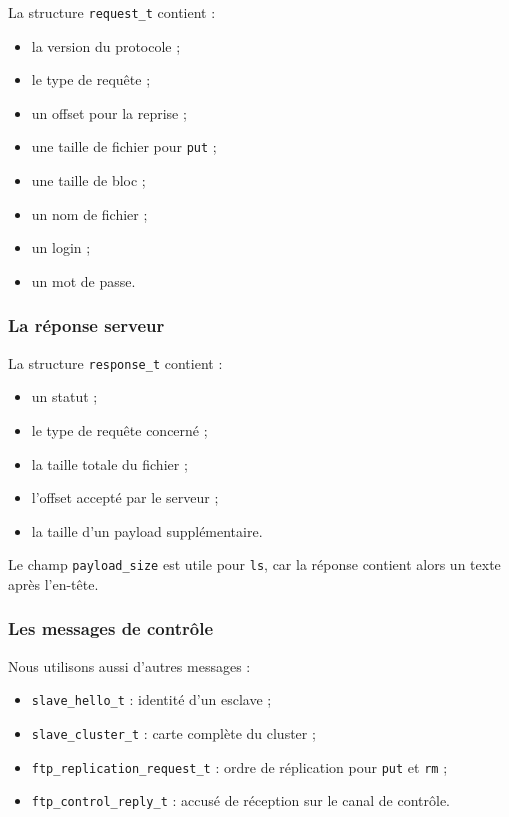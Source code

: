\documentclass[a4paper,11pt]{article}
\begin{document}
La structure \texttt{request\_t} contient :

\begin{itemize}[leftmargin=*]
    \item la version du protocole ;
    \item le type de requête ;
    \item un offset pour la reprise ;
    \item une taille de fichier pour \texttt{put} ;
    \item une taille de bloc ;
    \item un nom de fichier ;
    \item un login ;
    \item un mot de passe.
\end{itemize}

\subsubsection{La réponse serveur}

La structure \texttt{response\_t} contient :

\begin{itemize}[leftmargin=*]
    \item un statut ;
    \item le type de requête concerné ;
    \item la taille totale du fichier ;
    \item l'offset accepté par le serveur ;
    \item la taille d'un payload supplémentaire.
\end{itemize}

Le champ \texttt{payload\_size} est utile pour \texttt{ls}, car la réponse
contient alors un texte après l'en-tête.

\subsubsection{Les messages de contrôle}

Nous utilisons aussi d'autres messages :

\begin{itemize}[leftmargin=*]
    \item \texttt{slave\_hello\_t} : identité d'un esclave ;
    \item \texttt{slave\_cluster\_t} : carte complète du cluster ;
    \item \texttt{ftp\_replication\_request\_t} : ordre de réplication pour
    \texttt{put} et \texttt{rm} ;
    \item \texttt{ftp\_control\_reply\_t} : accusé de réception sur le canal de contrôle.
\end{itemize}
\end{document}
